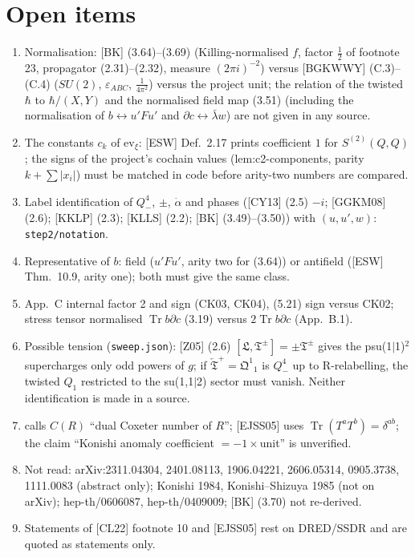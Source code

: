 \documentclass[11pt]{article}
\theoremstyle{definition}
\newcommand{\Tr}{\operatorname{Tr}}
\begin{document}
\section{Open items}
\begin{enumerate}
\item Normalisation: [BK] (3.64)--(3.69) (Killing-normalised $f$, factor $\frac12$ of footnote 23, propagator (2.31)--(2.32), measure $(2\pi i)^{-2}$) versus [BGKWWY] (C.3)--(C.4) ($SU(2)$, $\varepsilon_{ABC}$, $\frac1{4\pi^2}$) versus the project unit; the relation of the twisted $\hbar$ to $\hbar/(X,Y)$ and the normalised field map (3.51) (including the normalisation of $b\leftrightarrow u'Fu'$ and $\partial c\leftrightarrow\bar\lambda w$) are not given in any source.
\item The constants $c_k$ of $\mathrm{ev}_\xi$: [ESW] Def.~2.17 prints coefficient $1$ for $S^{(2)}(Q,Q)$; the signs of the project's cochain values (lem:c2-components, parity $k+\sum|x_i|$) must be matched in code before arity-two numbers are compared.
\item Label identification of $Q^4_-$, $\pm$, $\dot\alpha$ and phases ([CY13] (2.5) $-i$; [GGKM08] (2.6); [KKLP] (2.3); [KLLS] (2.2); [BK] (3.49)--(3.50)) with $(u,u',w)$: \texttt{step2/notation}.
\item Representative of $b$: field ($u'Fu'$, arity two for (3.64)) or antifield ([ESW] Thm.~10.9, arity one); both must give the same class.
\item [BGKWWY] App.~C internal factor 2 and sign (CK03, CK04), (5.21) sign versus CK02; stress tensor normalised $\Tr b\partial c$ (3.19) versus $2\Tr b\partial c$ (App.~B.1).
\item Possible tension (\texttt{sweep.json}): [Z05] (2.6) $[\mathfrak L,\mathfrak T^\pm]=\pm\mathfrak T^\pm$ gives the psu(1$|$1)$^2$ supercharges only odd powers of $g$; if $\overleftarrow{\mathfrak T}^+=\mathfrak Q^1{}_1$ is $Q^4_-$ up to R-relabelling, the twisted $Q_1$ restricted to the su(1,1$|$2) sector must vanish. Neither identification is made in a source.
\item [CL25] calls $C(R)$ ``dual Coxeter number of $R$''; [EJSS05] uses $\Tr(T^aT^b)=\delta^{ab}$; the claim ``Konishi anomaly coefficient $=-1\times$unit'' is unverified.
\item Not read: arXiv:2311.04304, 2401.08113, 1906.04221, 2606.05314, 0905.3738, 1111.0083 (abstract only); Konishi 1984, Konishi--Shizuya 1985 (not on arXiv); hep-th/0606087, hep-th/0409009; [BK] (3.70) not re-derived.
\item Statements of [CL22] footnote 10 and [EJSS05] rest on DRED/SSDR and are quoted as statements only.
\end{enumerate}
\end{document}
